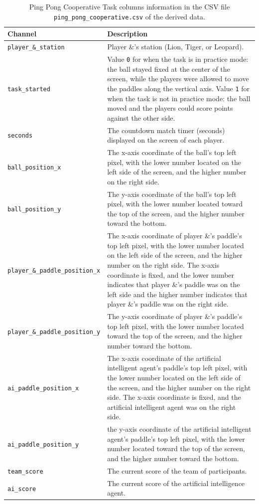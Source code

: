 \begin{table}
\centering
\begin{tabularx}{\textwidth}{lX}
\toprule
Channel & Description \\
\midrule
\texttt{player\_\&\_station} & Player \&'s station (Lion, Tiger, or Leopard).\\
\texttt{task\_started} & Value \texttt{0} for when the task is in practice mode: the ball stayed fixed at the center of the screen, while the players were allowed to move the paddles along the vertical axis. Value \texttt{1} for when the task is not in practice mode: the ball moved and the players could score points against the other side.\\
\texttt{seconds} & The countdown match timer (seconds) displayed on the screen of each player.\\
\texttt{ball\_position\_x} & The x-axis coordinate of the ball's top left pixel, with the lower number located on the left side of the screen, and the higher number on the right side.\\
\texttt{ball\_position\_y} & The y-axis coordinate of the ball's top left pixel, with the lower number located toward the top  of the screen, and the higher number toward the bottom.\\
\texttt{player\_\&\_paddle\_position\_x} & The x-axis coordinate of player \&'s paddle's top left pixel, with the lower number located on the left side of the screen, and the higher number on the right side. The x-axis coordinate is fixed, and the lower number indicates that player \&'s paddle was on the left side and the higher number indicates that player \&'s paddle was on the right side.\\
\texttt{player\_\&\_paddle\_position\_y} & The y-axis coordinate of player \&'s paddle's top left pixel, with the lower number located toward the top of the screen, and the higher number toward the bottom.\\
\texttt{ai\_paddle\_position\_x} & The x-axis coordinate of the artificial intelligent agent's paddle's top left pixel, with the lower number located on the left side of the screen, and the higher number on the right side. The x-axis coordinate is fixed, and the artificial intelligent agent was on the right side.\\
\texttt{ai\_paddle\_position\_y} & the y-axis coordinate of the artificial intelligent agent's paddle's top left pixel, with the lower number located toward the top of the screen, and the higher number toward the bottom.\\
\texttt{team\_score} & The current score of the team of participants.\\
\texttt{ai\_score} & The current score of the artificial intelligence agent.\\
\bottomrule
\end{tabularx}
\caption{Ping Pong Cooperative Task columns information in the CSV file \texttt{ping\_pong\_cooperative.csv} of the derived data.}
\label{tab:ping_pong_cooperative_task_columns}
\end{table}

